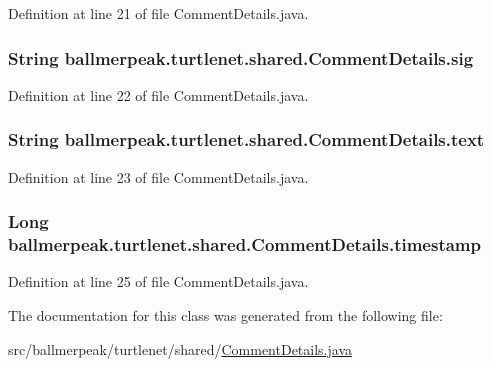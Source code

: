 Definition at line 21 of file Comment\-Details.\-java.

\hypertarget{classballmerpeak_1_1turtlenet_1_1shared_1_1CommentDetails_a6512dd32f4aab495d61c7592e8e38583}{
\subsubsection[{sig}]{\setlength{\rightskip}{0pt plus 5cm}String ballmerpeak.\-turtlenet.\-shared.\-Comment\-Details.\-sig}}\label{classballmerpeak_1_1turtlenet_1_1shared_1_1CommentDetails_a6512dd32f4aab495d61c7592e8e38583}


Definition at line 22 of file Comment\-Details.\-java.

\hypertarget{classballmerpeak_1_1turtlenet_1_1shared_1_1CommentDetails_a4aa59661e2b3ef7c1a3d25e38c53d7bf}{
\subsubsection[{text}]{\setlength{\rightskip}{0pt plus 5cm}String ballmerpeak.\-turtlenet.\-shared.\-Comment\-Details.\-text}}\label{classballmerpeak_1_1turtlenet_1_1shared_1_1CommentDetails_a4aa59661e2b3ef7c1a3d25e38c53d7bf}


Definition at line 23 of file Comment\-Details.\-java.

\hypertarget{classballmerpeak_1_1turtlenet_1_1shared_1_1CommentDetails_a8ac94ee627e504421f05caf66e592aff}{
\subsubsection[{timestamp}]{\setlength{\rightskip}{0pt plus 5cm}Long ballmerpeak.\-turtlenet.\-shared.\-Comment\-Details.\-timestamp}}\label{classballmerpeak_1_1turtlenet_1_1shared_1_1CommentDetails_a8ac94ee627e504421f05caf66e592aff}


Definition at line 25 of file Comment\-Details.\-java.



The documentation for this class was generated from the following file\-:\begin{DoxyCompactItemize}
\item 
src/ballmerpeak/turtlenet/shared/\hyperlink{CommentDetails_8java}{Comment\-Details.\-java}\end{DoxyCompactItemize}
